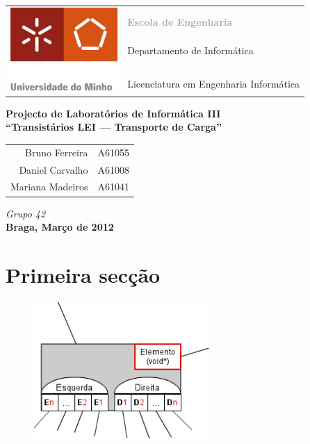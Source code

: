 \documentclass[a5paper,twocolumn, 11pt]{article}
\begin{document}
\onecolumn
\thispagestyle{empty}
\begin{tabular}{ll}
    \multirow{7}{*}{ \includegraphics[height=90pt]{logo.jpeg} }
    &\\
    & \textcolor{DarkGray}{\Large{\textbf{Escola de Engenharia}}} \\
    &\\
    & \large{Departamento de Informática}\\
    &\\
    &\\
    & \large{Licenciatura em Engenharia Informática}\\
\end{tabular}
\begin{center}
    \Large{\textbf{Projecto de Laboratórios de Informática III}}\\
    \vspace{20pt}
    \Large{\textbf{``Transistários LEI --- Transporte de Carga''}}\\
    \vspace{15pt}
    \begin{tabular}{r@{, }l}
        Bruno Ferreira&A61055\\
        Daniel Carvalho&A61008\\
        Mariana Madeiros&A61041\\
    \end{tabular}
    
    \vspace{5pt}
    \emph{Grupo 42}\\\vspace{15pt}
    \large{\textbf{Braga, Março de 2012}}
\end{center}

\newpage
\tableofcontents

\newpage
\twocolumn
\section{Primeira secção}
\lipsum[1-1]
\begin{figure}[htb!]
    \includegraphics[width=190pt]{image2.png}
\end{figure}
\lipsum[1-3]
\end{document}
